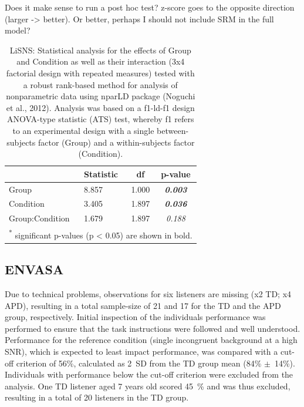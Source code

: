 \documentclass[a4paper, twoside]{templates/ociamthesis}
\begin{document}
\begin{correction}
Does it make sense to run a post hoc test? z-score goes to the opposite
direction (larger -\textgreater{} better). Or better, perhaps I should
not include SRM in the full model?
\end{correction}

\begin{table}

\caption{\label{tab:LiSNSz-Tab-nparLD}LiSNS: Statistical analysis for the effects of Group and Condition as well as their interaction (3x4 factorial design with repeated measures) tested with a robust rank-based method for analysis of nonparametric data using nparLD package (Noguchi et al., 2012). Analysis was based on a f1-ld-f1 design ANOVA-type statistic (ATS) test, whereby f1 refers to an experimental design with a single between-subjects factor (Group) and a within-subjects factor (Condition).}
\centering
\begin{tabular}[t]{llc>{}c}
\toprule
  & Statistic & df & p-value\\
\midrule
Group & 8.857 & 1.000 & \em{\textbf{0.003}}\\
Condition & 3.405 & 1.897 & \em{\textbf{0.036}}\\
Group:Condition & 1.679 & 1.897 & \em{0.188}\\
\bottomrule
\multicolumn{4}{l}{\textsuperscript{*} significant p-values (p < 0.05) are shown in bold.}\\
\end{tabular}
\end{table}

\hypertarget{envasa}{%
\subsection{ENVASA}\label{envasa}}

Due to technical problems, observations for six listeners are missing (x2 TD; x4 APD), resulting in a total sample-size of 21 and 17 for the TD and the APD group, respectively. Initial inspection of the individuals performance was performed to ensure that the task instructions were followed and well understood. Performance for the reference condition (single incongruent background at a high SNR), which is expected to least impact performance, was compared with a cut-off criterion of 56\%, calculated as 2~SD from the TD group mean (84\% \(\pm\)~14\%). Individuals with performance below the cut-off criterion were excluded from the analysis. One TD listener aged 7 years old scored 45~\% and was thus excluded, resulting in a total of 20 listeners in the TD group.
\end{document}
